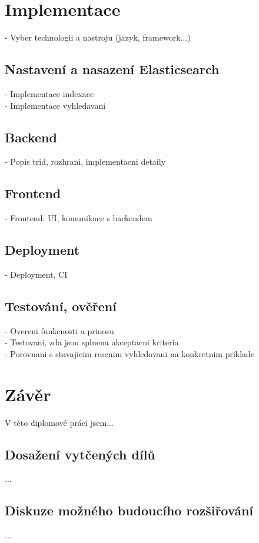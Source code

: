 \documentclass[FM,DP]{tulthesis}
\begin{document}
\chapter{Implementace}
- Vyber technologii a nastroju (jazyk, framework...)

\section{Nastavení a nasazení Elasticsearch}
- Implementace indexace\\
- Implementace vyhledavani

\section{Backend}
- Popis trid, rozhrani, implementacni detaily

\section{Frontend}
- Frontend: UI, komunikace s backendem

\section{Deployment}
- Deployment, CI

\section{Testování, ověření}
- Overeni funkcnosti a prinosu\\
- Testovani, zda jsou splnena akceptacni kriteria\\
- Porovnani s stavajicim resenim vyhledavani na konkretnim priklade


\chapter{Závěr}
V této diplomové práci jsem...

\section{Dosažení vytčených dílů}
...

\section{Diskuze možného budoucího rozšiřování}
...
\end{document}
